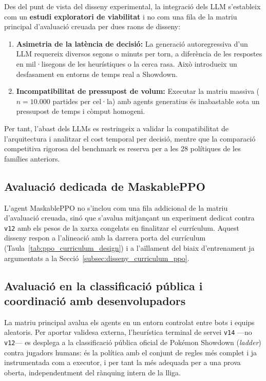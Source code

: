 Des del punt de vista del disseny experimental, la integració dels LLM s'estableix com un \textbf{estudi exploratori de viabilitat} i no com una fila de la matriu principal d'avaluació creuada per dues raons de disseny:
\begin{enumerate}
    \item \textbf{Asimetria de la latència de decisió:} La generació autoregressiva d'un LLM requereix diversos segons o minuts per torn, a diferència de les respostes en mil·lisegons de les heurístiques o la cerca rasa. Això introdueix un desfasament en entorns de temps real a Showdown.
    \item \textbf{Incompatibilitat de pressupost de volum:} Executar la matriu massiva ($n=10.000$ partides per cel·la) amb agents generatius és inabastable sota un pressupost de temps i còmput homogeni.
\end{enumerate}

Per tant, l'abast dels LLMs es restringeix a validar la compatibilitat de l'arquitectura i analitzar el cost temporal per decisió, mentre que la comparació competitiva rigorosa del benchmark es reserva per a les 28 polítiques de les famílies anteriors.

\subsection{Avaluació dedicada de MaskablePPO}

L'agent MaskablePPO no s'inclou com una fila addicional de la matriu d'avaluació creuada, sinó que s'avalua mitjançant un experiment dedicat contra \texttt{v12} amb els pesos de la xarxa congelats en finalitzar el currículum. Aquest disseny respon a l'alineació amb la darrera porta del currículum (Taula~\ref{tab:ppo_curriculum_design}) i a l'aïllament del biaix d'entrenament ja argumentats a la Secció~\ref{subsec:disseny_curriculum_ppo}.

\subsection{Avaluació en la classificació pública i coordinació amb desenvolupadors}

La matriu principal avalua els agents en un entorn controlat entre bots i equips aleatoris. Per aportar validesa externa, l'heurística terminal de servei \texttt{v14} ---no \texttt{v12}--- es desplega a la classificació pública oficial de Pokémon Showdown (\emph{ladder}) contra jugadors humans: és la política amb el conjunt de regles més complet i ja instrumentada com a executor, i per tant la més adequada per a una prova oberta, independentment del rànquing intern de la lliga.

